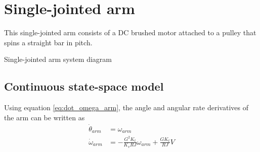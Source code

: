 \section{Single-jointed arm}
\label{sec:ss_model_single-jointed_arm}

This single-jointed arm consists of a DC brushed motor attached to a pulley that
spins a straight bar in pitch.
\begin{bookfigure}
  
  \caption{Single-jointed arm system diagram}
\end{bookfigure}

\subsection{Continuous state-space model}

Using equation \eqref{eq:dot_omega_arm}, the angle and angular rate derivatives
of the arm can be written as
\begin{align}
  \dot{\theta}_{arm} &= \omega_{arm} \\
  \dot{\omega}_{arm} &= -\frac{G^2 K_t}{K_v RJ} \omega_{arm} + \frac{G K_t}{RJ} V
\end{align}

